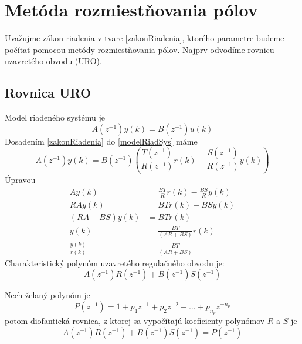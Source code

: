 \documentclass[a4paper, 10pt, ]{article}
\begin{document}
\section{Metóda rozmiestňovania pólov}

Uvažujme zákon riadenia v tvare \eqref{zakonRiadenia}, ktorého parametre budeme počítať pomocou metódy rozmiestňovania pólov. Najprv odvodíme rovnicu uzavretého obvodu (URO).




\subsection{Rovnica URO}


Model riadeného systému je
\begin{equation} \label{modelRiadSys}
	A(z^{-1})y(k)
	=
		B(z^{-1})u(k)
\end{equation}
Dosadením \eqref{zakonRiadenia} do \eqref{modelRiadSys} máme
\begin{equation}
	A(z^{-1})y(k) = B(z^{-1}) \left( \frac{T(z^{-1})}{R(z^{-1})}r(k) - \frac{S(z^{-1})}{R(z^{-1})}y(k) \right)
\end{equation}
Úpravou
\begin{subequations}
	\begin{align}
		A y(k) &= \frac{BT}{R} r(k) - \frac{BS}{R} y(k) \\
		RA y(k) &= BT r(k) - BS y(k)\\
		\left( RA + BS \right) y(k) &= BT r(k) \\
		y(k) &= \frac{BT}{\left( AR + BS \right)} r(k) \\
		\frac{y(k)}{r(k)} &= \frac{BT}{\left( AR + BS \right)}
	\end{align}
\end{subequations}
Charakteristický polynóm uzavretého regulačného obvodu je:
\begin{equation}
	A(z^{-1})R(z^{-1}) + B(z^{-1})S(z^{-1})
\end{equation}


Nech želaný polynóm je
\begin{equation}
	P(z^{-1})  = 1 + p_1z^{-1} + p_2z^{-2} + \ldots +  p_{n_p}z^{-n_p}
\end{equation}
potom diofantická rovnica, z ktorej sa vypočítajú koeficienty polynómov $R$ a $S$ je
\begin{equation} \label{prvaDiofantRovn}
	A(z^{-1})R(z^{-1}) + B(z^{-1})S(z^{-1})  = 	P(z^{-1})
\end{equation}
\end{document}
